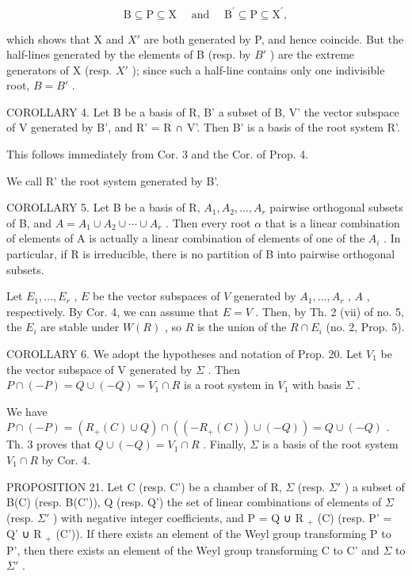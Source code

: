 \[
\mathrm{B} \subseteq \mathrm{P} \subseteq \mathrm{X} \quad \text { and } \quad \mathrm{B} ^ {\prime} \subseteq \mathrm{P} \subseteq \mathrm{X} ^ {\prime},
\]

which shows that X and \(X'\) are both generated by P, and hence coincide. But the half-lines generated by the elements of B (resp. by \(B'\) ) are the extreme generators of X (resp. \(X'\) ); since such a half-line contains only one indivisible root, \(B = B'\) .

COROLLARY 4. Let B be a basis of R, B' a subset of B, V' the vector subspace of V generated by B', and R' = R ∩ V'. Then B' is a basis of the root system R'.

This follows immediately from Cor. 3 and the Cor. of Prop. 4.

We call R' the root system generated by B'.

COROLLARY 5. Let B be a basis of R, \(A_{1}, A_{2}, \ldots, A_{r}\) pairwise orthogonal subsets of B, and \(A = A_{1} \cup A_{2} \cup \cdots \cup A_{r}\) . Then every root \(\alpha\) that is a linear combination of elements of A is actually a linear combination of elements of one of the \(A_{i}\) . In particular, if R is irreducible, there is no partition of B into pairwise orthogonal subsets.

Let \(E_1, \ldots, E_r\) , \(E\) be the vector subspaces of \(V\) generated by \(A_1, \ldots, A_r\) , \(A\) , respectively. By Cor. 4, we can assume that \(E = V\) . Then, by Th. 2 (vii) of no. 5, the \(E_i\) are stable under \(W(R)\) , so \(R\) is the union of the \(R \cap E_i\) (no. 2, Prop. 5).

COROLLARY 6. We adopt the hypotheses and notation of Prop. 20. Let \(V_{1}\) be the vector subspace of V generated by \(\Sigma\) . Then \(P \cap (-P) = Q \cup (-Q) = V_{1} \cap R\) is a root system in \(V_{1}\) with basis \(\Sigma\) .

We have \(P \cap (-P) = (R_{+}(C) \cup Q) \cap ((-R_{+}(C)) \cup (-Q)) = Q \cup (-Q)\) . Th. 3 proves that \(Q \cup (-Q) = V_{1} \cap R\) . Finally, \(\Sigma\) is a basis of the root system \(V_{1} \cap R\) by Cor. 4.

PROPOSITION 21. Let C (resp. C') be a chamber of R, \(\Sigma\) (resp. \(\Sigma'\) ) a subset of B(C) (resp. B(C')), Q (resp. Q') the set of linear combinations of elements of \(\Sigma\) (resp. \(\Sigma'\) ) with negative integer coefficients, and P = Q ∪ R \(_{+}\) (C) (resp. P' = Q' ∪ R \(_{+}\) (C')). If there exists an element of the Weyl group transforming P to P', then there exists an element of the Weyl group transforming C to C' and \(\Sigma\) to \(\Sigma'\) .

